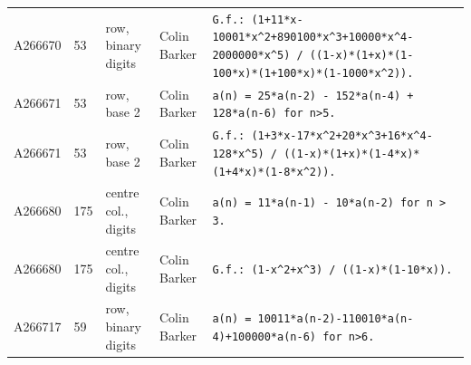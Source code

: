 \documentclass[11pt]{article}
\theoremstyle{definition}
\theoremstyle{remark}
\begin{document}
{\begin{longtable}{p{1.3cm}p{0.7cm}p{2.4cm}p{2.3cm}p{7.3cm}}
A266670 & 53 & row, binary digits & Colin Barker & \texttt{G.f.: \allowbreak{}(1+\allowbreak{}11*\allowbreak{}x-\allowbreak{}10001*\allowbreak{}x\^{}2+\allowbreak{}890100*\allowbreak{}x\^{}3+\allowbreak{}10000*\allowbreak{}x\^{}4-\allowbreak{}2000000*\allowbreak{}x\^{}5)\allowbreak{} \allowbreak{}/\allowbreak{} \allowbreak{}((1-\allowbreak{}x)\allowbreak{}*\allowbreak{}(1+\allowbreak{}x)\allowbreak{}*\allowbreak{}(1-\allowbreak{}100*\allowbreak{}x)\allowbreak{}*\allowbreak{}(1+\allowbreak{}100*\allowbreak{}x)\allowbreak{}*\allowbreak{}(1-\allowbreak{}1000*\allowbreak{}x\^{}2)\allowbreak{})\allowbreak{}.} \\
A266671 & 53 & row, base 2 & Colin Barker & \texttt{a(n)\allowbreak{} \allowbreak{}=\allowbreak{} \allowbreak{}25*\allowbreak{}a(n-\allowbreak{}2)\allowbreak{} \allowbreak{}-\allowbreak{} \allowbreak{}152*\allowbreak{}a(n-\allowbreak{}4)\allowbreak{} \allowbreak{}+\allowbreak{} \allowbreak{}128*\allowbreak{}a(n-\allowbreak{}6)\allowbreak{} \allowbreak{}for \allowbreak{}n>5.} \\
A266671 & 53 & row, base 2 & Colin Barker & \texttt{G.f.: \allowbreak{}(1+\allowbreak{}3*\allowbreak{}x-\allowbreak{}17*\allowbreak{}x\^{}2+\allowbreak{}20*\allowbreak{}x\^{}3+\allowbreak{}16*\allowbreak{}x\^{}4-\allowbreak{}128*\allowbreak{}x\^{}5)\allowbreak{} \allowbreak{}/\allowbreak{} \allowbreak{}((1-\allowbreak{}x)\allowbreak{}*\allowbreak{}(1+\allowbreak{}x)\allowbreak{}*\allowbreak{}(1-\allowbreak{}4*\allowbreak{}x)\allowbreak{}*\allowbreak{}(1+\allowbreak{}4*\allowbreak{}x)\allowbreak{}*\allowbreak{}(1-\allowbreak{}8*\allowbreak{}x\^{}2)\allowbreak{})\allowbreak{}.} \\
A266680 & 175 & centre col., digits & Colin Barker & \texttt{a(n)\allowbreak{} \allowbreak{}=\allowbreak{} \allowbreak{}11*\allowbreak{}a(n-\allowbreak{}1)\allowbreak{} \allowbreak{}-\allowbreak{} \allowbreak{}10*\allowbreak{}a(n-\allowbreak{}2)\allowbreak{} \allowbreak{}for \allowbreak{}n \allowbreak{}> \allowbreak{}3.} \\
A266680 & 175 & centre col., digits & Colin Barker & \texttt{G.f.: \allowbreak{}(1-\allowbreak{}x\^{}2+\allowbreak{}x\^{}3)\allowbreak{} \allowbreak{}/\allowbreak{} \allowbreak{}((1-\allowbreak{}x)\allowbreak{}*\allowbreak{}(1-\allowbreak{}10*\allowbreak{}x)\allowbreak{})\allowbreak{}.} \\
A266717 & 59 & row, binary digits & Colin Barker & \texttt{a(n)\allowbreak{} \allowbreak{}=\allowbreak{} \allowbreak{}10011*\allowbreak{}a(n-\allowbreak{}2)\allowbreak{}-\allowbreak{}110010*\allowbreak{}a(n-\allowbreak{}4)\allowbreak{}+\allowbreak{}100000*\allowbreak{}a(n-\allowbreak{}6)\allowbreak{} \allowbreak{}for \allowbreak{}n>6.} \\

\end{longtable}}
\end{document}
